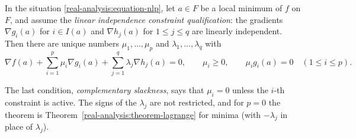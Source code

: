 \begin{theorem}\label{real-analysis:theorem-kkt}
In the situation \eqref{real-analysis:equation-nlp}, let $a \in F$ be a local minimum of $f$ on $F$, and assume the \emph{linear independence constraint qualification}: the gradients $\nabla g_i(a)$ for
$i \in I(a)$ and $\nabla h_j(a)$ for $1 \leq j \leq q$ are linearly independent. Then there are unique numbers $\mu_1, \ldots, \mu_p$ and $\lambda_1, \ldots, \lambda_q$ with
\begin{equation}\label{real-analysis:equation-kkt}
\nabla f(a) + \sum_{i=1}^p\mu_i\nabla g_i(a) + \sum_{j=1}^q\lambda_j\nabla h_j(a) = 0, \qquad \mu_i \geq 0, \qquad \mu_ig_i(a) = 0 \quad (1 \leq i \leq p).
\end{equation}
\end{theorem}

The last condition, \emph{complementary slackness}, says that $\mu_i = 0$ unless the $i$-th constraint is active. The signs of the $\lambda_j$ are not restricted, and for $p = 0$ the theorem is
Theorem~\ref{real-analysis:theorem-lagrange} for minima (with $-\lambda_j$ in place of $\lambda_j$).

